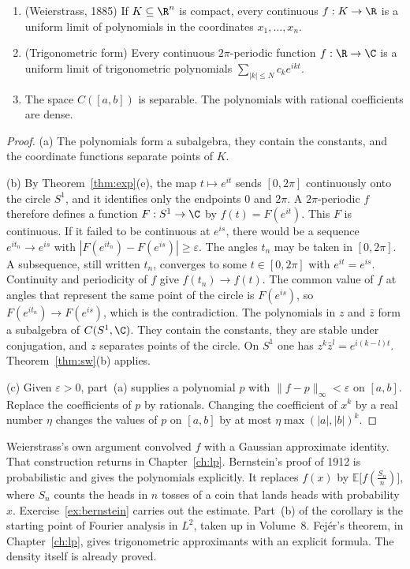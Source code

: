 \begin{corollary}\label{cor:weierstrass}
\begin{enumerate}[label=(\alph*)]
\item (Weierstrass, 1885) If $K\subseteq\R^n$ is compact, every continuous $f:K\to\R$ is a uniform limit of polynomials in the coordinates $x_1,\dots,x_n$.
\item (Trigonometric form) Every continuous $2\pi$-periodic function $f:\R\to\C$ is a uniform limit of trigonometric polynomials $\sum_{|k|\le N}c_ke^{ikt}$.
\item The space $C([a,b])$ is separable. The polynomials with rational coefficients are dense.
\end{enumerate}
\end{corollary}
\begin{proof}
(a) The polynomials form a subalgebra, they contain the constants, and the coordinate functions separate points of $K$.

(b) By Theorem~\ref{thm:exp}(e), the map $t\mapsto e^{it}$ sends $[0,2\pi]$ continuously onto the circle $S^1$, and it identifies only the endpoints $0$ and $2\pi$. A $2\pi$-periodic $f$ therefore defines a function $F:S^1\to\C$ by $f(t)=F(e^{it})$. This $F$ is continuous. If it failed to be continuous at $e^{is}$, there would be a sequence $e^{it_n}\to e^{is}$ with $|F(e^{it_n})-F(e^{is})|\ge\varepsilon$. The angles $t_n$ may be taken in $[0,2\pi]$. A subsequence, still written $t_n$, converges to some $t\in[0,2\pi]$ with $e^{it}=e^{is}$. Continuity and periodicity of $f$ give $f(t_n)\to f(t)$. The common value of $f$ at angles that represent the same point of the circle is $F(e^{is})$, so $F(e^{it_n})\to F(e^{is})$, which is the contradiction. The polynomials in $z$ and $\bar z$ form a subalgebra of $C(S^1,\C)$. They contain the constants, they are stable under conjugation, and $z$ separates points of the circle. On $S^1$ one has $z^k\bar z^l=e^{i(k-l)t}$. Theorem~\ref{thm:sw}(b) applies.

(c) Given $\varepsilon>0$, part~(a) supplies a polynomial $p$ with $\|f-p\|_\infty<\varepsilon$ on $[a,b]$. Replace the coefficients of $p$ by rationals. Changing the coefficient of $x^k$ by a real number $\eta$ changes the values of $p$ on $[a,b]$ by at most $\eta\max(|a|,|b|)^k$.
\end{proof}

Weierstrass's own argument convolved $f$ with a Gaussian approximate identity. That construction returns in Chapter~\ref{ch:lp}. Bernstein's proof of 1912 is probabilistic and gives the polynomials explicitly. It replaces $f(x)$ by $\mathbb E\bigl[f(\frac{S_n}n)\bigr]$, where $S_n$ counts the heads in $n$ tosses of a coin that lands heads with probability $x$. Exercise~\ref{ex:bernstein} carries out the estimate. Part~(b) of the corollary is the starting point of Fourier analysis in $L^2$, taken up in Volume~8. Fej\'er's theorem, in Chapter~\ref{ch:lp}, gives trigonometric approximants with an explicit formula. The density itself is already proved.

